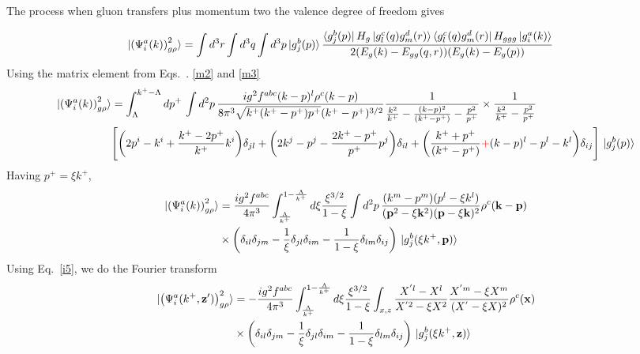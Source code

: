 \documentclass[aps,prd,amsmath,amssymb,nofootinbib]{revtex4-2}
\def\v#1{\mathbf{#1}}
\numberwithin{equation}{section}
\begin{document}
The process when gluon transfers plus momentum two the valence degree of freedom gives 
\begin{figure}[h]
\end{figure}
\begin{align}\label{onegrho2}
  \ket{ \left(\Psi^{a}_{i}(k) \right)^{2}_{g \rho} }%
   & =  \int d^{3}r \int d^{3}q \int d^{3}p
  \ket{g^{b}_{j}(p)}
  \frac{\bra{g^{b}_{j}(p)}H_{g}\ket{g^{c}_{l}(q)g^{d}_{m}(r)}\bra{g^{c}_{l}(q)g^{d}_{m}(r)}H_{ggg}\ket{g^{a}_{i}(k)}}{2(E_{g}(k)-E_{gg}(q,r))(E_{g }(k)-E_{g}(p))}
\end{align}
Using the matrix element from Eqs.~. \eqref{m2} and \eqref{m3}
\begin{align}\label{onegrho22}
\ket{ \left(\Psi^{a}_{i}(k) \right)^{2}_{g \rho} }   &= \int_{\Lambda}^{k^{+}-\Lambda}dp^{+}\,\int d^{2}p\,\frac{ig^{2}f^{abc}(k-p)^{l}\rho^{c}(k-p)}{8\pi^{3}\sqrt{k^{+}(k^{+}-p^{+})p^{+}}(k^{+}-p^{+})^{3/2}}\frac{1}{\frac{k^{2}}{k^{+}}-\frac{(k-p)^{2}}{(k^{+}-p^{+})}-\frac{p^{2}}{p^{+}}}\times \frac{1}{\frac{k^{2}}{k^{+}}-\frac{p^{2}}{p^{+}}}\notag \\ & \Bigg[\bigg(2p^{i}-k^{i}+\frac{k^{+}-2p^{+}}{k^{+}}k^{i}\bigg)\delta_{jl} +\bigg(2k^{j}-p^{j}-\frac{2k^{+}-p^{+}}{p^{+}}p^{j}\bigg)\delta_{il}+\bigg(\frac{k^{+}+p^{+}}{(k^{+}-p^{+})}\textcolor{red}{+}(k-p)^{l}-p^{l}-k^{l}\bigg)\delta_{ij}\Bigg]\,\ket{g^{b}_{j}(p)}
\end{align}
Having $p^{+} = \xi k^{+}$,
\begin{align}
\ket{ \left(\Psi^{a}_{i}(k) \right)^{2}_{g \rho} }   & = \frac{i g^2 f^{abc}} {4\pi^3} 
   \int_{\frac{\Lambda}{k^+}   }^{ 1- \frac{\Lambda }{k^+} } %
   d \xi 
  \frac{\xi^{3/2}}{1-\xi} 
   \int d^{2}p\,
  \frac{(k^m - p^m) (p^l - \xi k^l)} {(\v{p}^2-\xi \v{k}^2) (\v{p} - \xi \v{k})^2}
   \rho^c(\v{k}-\v{p})
  \notag \\ & \times 
  \left(\delta_{il} \delta_{jm} - \frac{1}{\xi} \delta_{jl} \delta_{im} - \frac{1}{1-\xi} \delta_{lm}\delta_{ij} \right)\,\ket{g^{b}_{j}(\xi k^+,\v{p})}
\end{align}
Using Eq.~\eqref{i5}, we do the Fourier transform
\begin{align}%
\label{Eq:onegrhoX2}
  \notag
  \ket{ \left(\Psi^{a}_{i}(k^+, \v{z}') \right)^{2}_{g \rho} }%
   &= - \frac{i g^2 f^{abc}} {4\pi^3} 
   \int_{\frac{\Lambda}{k^+}   }^{ 1- \frac{\Lambda }{k^+} } %
   d \xi 
  \frac{\xi^{3/2}}{1-\xi} 
   \int_{x,z}
   \frac{X^{'l} - X^l} {X^{'2} - \xi X^2}
   \frac{X^{'m} -  \xi X^m} {(X^{'} -  \xi X)^2}
   \rho^c(\v{x})
  \notag \\ & \times 
  \left(\delta_{il} \delta_{jm} - \frac{1}{\xi} \delta_{jl} \delta_{im} - \frac{1}{1-\xi} \delta_{lm}\delta_{ij} \right)\,\ket{g^{b}_{j}(\xi k^+,\v{z})}
\end{align}
\end{document}
